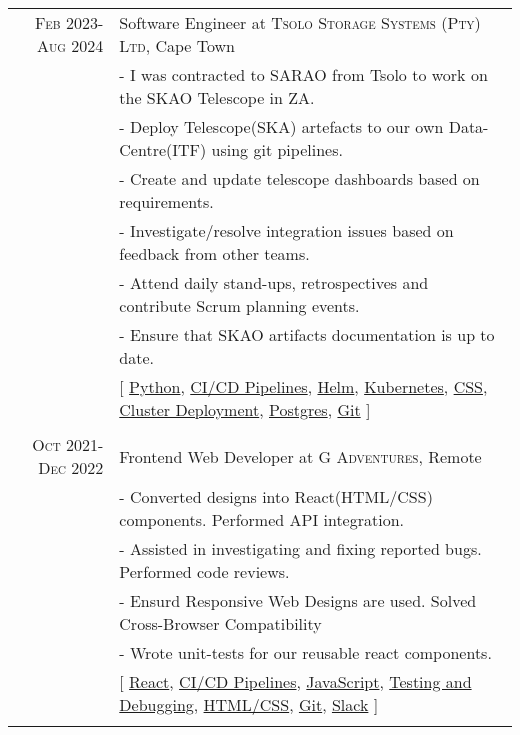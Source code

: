 \documentclass[a4paper,10pt]{article} %
\begin{document}
\begin{tabular}{r|p{15cm}}
\textsc{Feb 2023-Aug 2024} & Software Engineer at \textsc{Tsolo Storage Systems (Pty) Ltd}, Cape Town \emph{}\\
& \footnotesize{- I was contracted to SARAO from Tsolo to work on the SKAO Telescope in ZA.}\\
& \footnotesize{- Deploy Telescope(SKA) artefacts to our own Data-Centre(ITF) using git pipelines.}\\
& \footnotesize{- Create and update telescope dashboards based on requirements.}\\
& \footnotesize{- Investigate/resolve integration issues based on feedback from other teams.}\\
& \footnotesize{- Attend daily stand-ups, retrospectives and contribute Scrum planning events.}\\
& \footnotesize{- Ensure that SKAO artifacts documentation is up to date.}\\
& \footnotesize{[ \href{https://www.python.org/}{Python}, \href{https://github.com/solutions/ci-cd}{CI/CD Pipelines}, \href{https://helm.sh/}{Helm}, \href{https://kubernetes.io/}{Kubernetes}, \href{https://datatracker.ietf.org/doc/html/rfc7993}{CSS}, \href{https://kubernetes.io/docs/concepts/workloads/controllers/deployment/}{Cluster Deployment}, \href{https://www.postgresql.org/}{Postgres}, \href{https://git-scm.com/}{Git}   ]}\\
\multicolumn{2}{c}{} \\


\textsc{Oct 2021-Dec 2022} & Frontend Web Developer at \textsc{G Adventures}, Remote \emph{}\\
& \footnotesize{- Converted designs into React(HTML/CSS) components. Performed API integration.}\\
& \footnotesize{- Assisted in investigating and fixing reported bugs. Performed code reviews.}\\
& \footnotesize{- Ensurd Responsive Web Designs are used. Solved Cross-Browser Compatibility}\\
& \footnotesize{- Wrote unit-tests for our reusable react components.}\\
& \footnotesize{[ \href{https://react.dev/}{React}, \href{https://github.com/solutions/ci-cd}{CI/CD Pipelines}, \href{https://developer.mozilla.org/en-US/docs/Web/JavaScript}{JavaScript}, \href{https://jestjs.io/}{Testing and Debugging}, \href{https://datatracker.ietf.org/doc/html/rfc7993}{HTML/CSS}, \href{https://git-scm.com/}{Git}, \href{https://slack.com/}{Slack} ]}\\
\multicolumn{2}{c}{} \\


\end{tabular}
\end{document}
